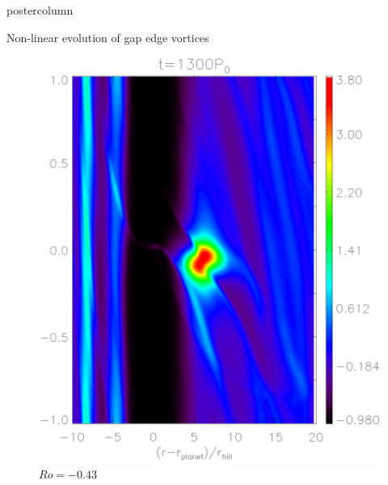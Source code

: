 \documentclass[final,hyperref={pdfpagelabels=false}]{beamer}
\begin{document}
\begin{frame}
\begin{columns}
\begin{column}{.49\textwidth}
\begin{beamercolorbox}[center,wd=\textwidth]{postercolumn}
\begin{minipage}[T]{.95\textwidth}
{\begin{block}{\Large{Non-linear evolution of gap edge
                  vortices}}
\begin{figure}
\begin{minipage}{0.3\textwidth}
                      \caption{$Ro=-0.16$}
                    \end{minipage}
                    \hfill
                    \begin{minipage}{0.3\textwidth}
                      \includegraphics[width=\textwidth]{Posterfig_During}
                      \caption{$Ro=-0.43$}
                    \end{minipage}
                    \hfill
                    \begin{minipage}{0.3\textwidth}

\end{minipage}
\end{figure}
\end{block}}
\end{minipage}
\end{beamercolorbox}
\end{column}
\end{columns}
\end{frame}
\end{document}
